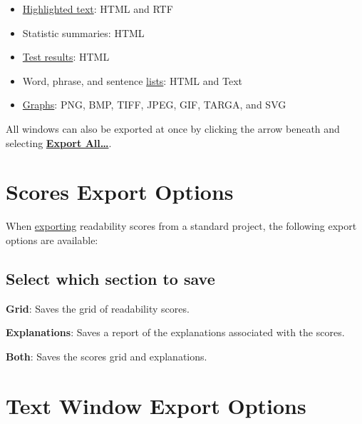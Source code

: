 \documentclass[
]{book}
\providecommand{\tightlist}{%
  \setlength{\itemsep}{0pt}\setlength{\parskip}{0pt}}
\newenvironment{optionssection}
    {
    \begin{tcolorbox}[colframe=lightgray,colback=ultralightgray,sharp corners=all,parbox=false]
    }
    {
    \end{tcolorbox}
    }
\theoremstyle{definition}
\theoremstyle{definition}
\theoremstyle{definition}
\theoremstyle{definition}
\theoremstyle{remark}
\begin{document}
\begin{itemize}
\tightlist
\item
  \protect\hyperlink{text-window-export}{Highlighted text}: HTML and RTF
\item
  Statistic summaries: HTML
\item
  \protect\hyperlink{scores-export}{Test results}: HTML
\item
  Word, phrase, and sentence \protect\hyperlink{export-list}{lists}: HTML and Text
\item
  \protect\hyperlink{image-export}{Graphs}: PNG, BMP, TIFF, JPEG, GIF, TARGA, and SVG
\end{itemize}

All windows can also be exported at once by clicking the arrow beneath  and selecting \protect\hyperlink{export-all-options}{\textbf{Export All\ldots{}}}.

\hypertarget{scores-export}{%
\section{Scores Export Options}\label{scores-export}}

When \protect\hyperlink{exporting}{exporting} readability scores from a standard project, the following export options are available:

\hypertarget{select-which-section-to-save}{%
\subsection*{Select which section to save}\label{select-which-section-to-save}}

\begin{optionssection}
\textbf{Grid}: Saves the grid of readability scores.

\textbf{Explanations}: Saves a report of the explanations associated with the scores.

\textbf{Both}: Saves the scores grid and explanations.

\end{optionssection}

\hypertarget{text-window-export}{%
\section{Text Window Export Options}\label{text-window-export}}
\end{document}
